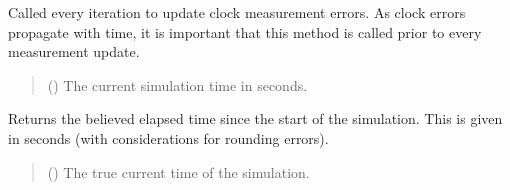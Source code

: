 \documentclass[letterpaper,10pt,english]{sphinxmanual}
\begin{document}
\begin{fulllineitems}
\label{\detokenize{modules/measurement/clock:qnav.measurement.clock.DummyClock}}
\pysigstartsignatures
{}
\pysigstopsignatures{}

\begin{fulllineitems}
\label{\detokenize{modules/measurement/clock:qnav.measurement.clock.DummyClock.update}}
\pysigstartsignatures
{}
\pysigstopsignatures
\sphinxAtStartPar
Called every iteration to update clock measurement errors.
As clock errors propagate with time, it is important that this
method is called prior to every measurement update.
\begin{quote}\begin{description}
\sphinxAtStartPar
{} () \textendash{} The current simulation time in seconds.

\end{description}\end{quote}

\end{fulllineitems}


\begin{fulllineitems}
\label{\detokenize{modules/measurement/clock:qnav.measurement.clock.DummyClock.get_time}}
\pysigstartsignatures
{}
\pysigstopsignatures
\sphinxAtStartPar
Returns the believed elapsed time since the start of the simulation.
This is given in seconds (with considerations for rounding errors).
\begin{quote}\begin{description}
\sphinxAtStartPar
{} () \textendash{} The true current time of the simulation.


\end{description}
\end{quote}
\end{fulllineitems}
\end{fulllineitems}
\end{document}

